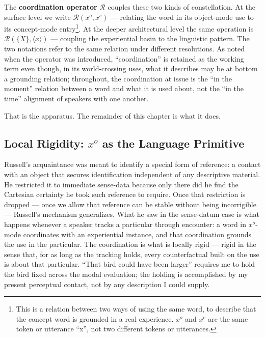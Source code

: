 \documentclass[12pt,a4paper]{article}
\begin{document}
The \textbf{coordination operator} \(\mathcal{R}\) couples these two kinds of constellation. At the surface level we write \(\mathcal{R}(x^o, x^c)\) --- relating the word in its object-mode use to its concept-mode entry\footnote{This is a relation between two ways of using the same word, to describe that the concept word is grounded in a real experience. \(x^o\) and \(x^c\) are the same token or utterance ``x'', not two different tokens or utterances.}. At the deeper architectural level the same operation is \(\mathcal{R}(\{X\}, \langle x \rangle)\) --- coupling the experiential basin to the linguistic pattern. The two notations refer to the same relation under different resolutions. As noted when the operator was introduced, ``coordination'' is retained as the working term even though, in its world-crossing uses, what it describes may be at bottom a grounding relation; throughout, the coordination at issue is the ``in the moment'' relation between a word and what it is used about, not the ``in the time'' alignment of speakers with one another.

That is the apparatus. The remainder of this chapter is what it does.

\subsection{\texorpdfstring{Local Rigidity: \(x^o\) as the Language Primitive}{Local Rigidity: x\^{}o as the Language Primitive}}\label{local-rigidity-xo-as-the-language-primitive}

Russell's acquaintance was meant to identify a special form of reference: a contact with an object that secures identification independent of any descriptive material. He restricted it to immediate sense-data because only there did he find the Cartesian certainty he took such reference to require. Once that restriction is dropped --- once we allow that reference can be stable without being incorrigible --- Russell's mechanism generalizes. What he saw in the sense-datum case is what happens whenever a speaker tracks a particular through encounter: a word in \(x^o\)-mode coordinates with an experiential instance, and that coordination grounds the use in the particular. The coordination is what is locally rigid --- rigid in the sense that, for as long as the tracking holds, every counterfactual built on the use is about that particular. ``That bird could have been larger'' requires me to hold the bird fixed across the modal evaluation; the holding is accomplished by my present perceptual contact, not by any description I could supply.
\end{document}
